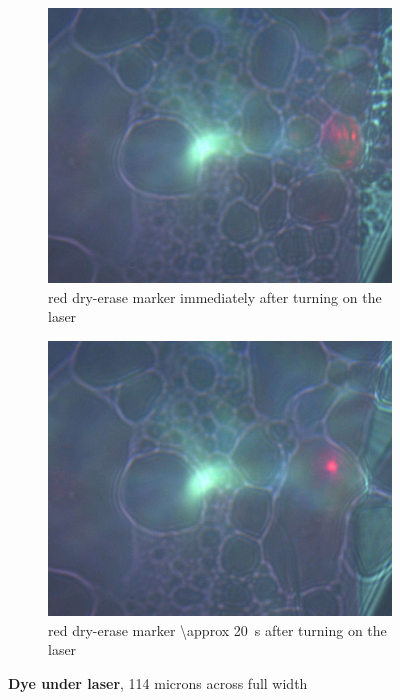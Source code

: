 \begin{figure}
  \begin{subfigure}{.45\textwidth}
    \centering
    \includegraphics[width=\textwidth]{./img/red-1.jpg}
    \caption{red dry-erase marker immediately after turning on the laser}
  \end{subfigure}
  \begin{subfigure}{.45\textwidth}
    \centering
    \includegraphics[width=\textwidth]{./img/red-2.jpg}
    \caption{red dry-erase marker \SI{\approx 20}{\s} after turning on the laser}
  \end{subfigure}

  \caption[Dye under laser]{\textbf{Dye under laser}, \num{114} microns across full width}
\end{figure}
